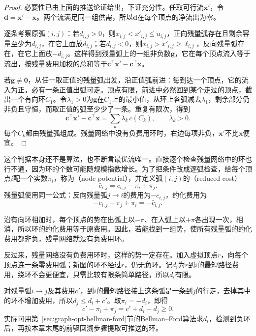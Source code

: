 \begin{proof}
必要性已由上面的推送论证给出，下证充分性。任取可行流$\bm x'$，令$\bm d=\bm x'-\bm x$。两个流满足同一组供需，所以$\bm d$在每个顶点的净流出为零。

逐条考察原弧$(i,j)$：若$d_{i,j}>0$，则$x_{i,j}<x'_{i,j}\leq u_{i,j}$，正向残量弧存在且剩余容量至少为$d_{i,j}$，在它上面放$d_{i,j}$；若$d_{i,j}<0$，则$x_{i,j}>x'_{i,j}\geq\ell_{i,j}$，反向残量弧存在，在它上面放$-d_{i,j}$。这样得到残量弧上的一组非负数$\bm g$，它在每个顶点流入等于流出，按残量费用加权的总和等于$\bm c^{\top}\bm x'-\bm c^{\top}\bm x$。

若$\bm g\neq\bm 0$，从任一取正值的残量弧出发，沿正值弧前进：每到达一个顶点，它的流入为正，必有一条正值出弧可走。顶点有限，前进中必然回到某个走过的顶点，截出一个有向环$C_1$。令$\lambda_1>0$为$\bm g$在$C_1$上的最小值，从环上各弧减去$\lambda_1$，剩余部分仍非负且守恒，而取正值的弧至少少了一条。重复有限次，得到
\[
  \bm c^{\top}\bm x'-\bm c^{\top}\bm x=\sum_k\lambda_k\,c(C_k),\qquad\lambda_k>0.
\]
每个$C_k$都由残量弧组成。残量网络中没有负费用环时，右边每项非负，$\bm x'$不比$\bm x$便宜。
\end{proof}

这个判据本身还不是算法，也不断言最优流唯一。直接逐个检查残量网络中的环也行不通，因为环的个数可能随规模指数增长。为了把条件改成逐弧检查，给每个顶点$i$配一个实数$\pi_i$，称为（node potential），并定义弧$(i,j)$的（reduced cost）
\begin{equation}
  \bar c_{i,j}=c_{i,j}-\pi_i+\pi_j.
  \label{eq:graph-opt-reduced-cost}
\end{equation}
残量弧使用同一公式：反向残量弧$j\to i$的费用为$-c_{i,j}$，约化费用为
\[
  -c_{i,j}-\pi_j+\pi_i=-\bar c_{i,j}.
\]

沿有向环相加时，每个顶点的势在出弧上以$-\pi$、在入弧上以$+\pi$各出现一次，相消，所以环的约化费用等于原费用。因此，若能找到一组势，使所有残量弧的约化费用都非负，残量网络就没有负费用环。

反过来，残量网络没有负费用环时，这样的势一定存在。加入虚拟顶点$r$，向每个顶点连一条零费用弧；新图的环不经过$r$，仍无负环。记$d_i$为$r$到$i$的最短路径费用，绕环不会更便宜，只需比较有限条简单路径，所以$d_i$有限。

对残量弧$i\to j$及其费用$c'$，到$i$的最短路径接上这条弧是一条到$j$的行走，去掉其中的环不增加费用，所以$d_j\leq d_i+c'$。取$\pi_i=-d_i$，即得
\[
  c'-\pi_i+\pi_j=c'+d_i-d_j\geq0.
\]
实际可用第~\ref{sec:graph-opt-bellman-ford}节的Bellman--Ford算法求$d_i$，检测到负环后，再按本章末尾的前驱回溯步骤提取可推送的环。

